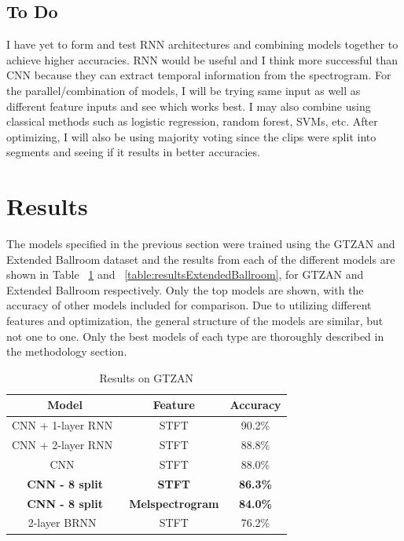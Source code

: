 \documentclass[10pt,twocolumn,letterpaper]{article}
\begin{document}
	\subsection{To Do}
	
	I have yet to form and test RNN architectures and combining models together to achieve higher accuracies. RNN would be useful and I think more successful than CNN because they can extract temporal information from the spectrogram. For the parallel/combination of models, I will be trying same input as well as different feature inputs and see which works best. I may also combine using classical methods such as logistic regression, random forest, SVMs, etc. After optimizing, I will also be using majority voting since the clips were split into segments and seeing if it results in better accuracies.
	
	\section{Results}
	
	The models specified in the previous section were trained using the GTZAN and Extended Ballroom dataset and the results from each of the different models are shown in Table ~\ref{table:resultsGTZAN} and ~\ref{table:resultsExtendedBallroom}, for GTZAN and Extended Ballroom respectively. Only the top models are shown, with the accuracy of other models included for comparison. Due to utilizing different features and optimization, the general structure of the models are similar, but not one to one. Only the best models of each type are thoroughly described in the methodology section.
	
	\begin{table}[!htbp] %
	\caption{Results on GTZAN}
	\centering
		\begin{tabular}[b]{ccc}
			\hline \hline
			Model & Feature & Accuracy 	\\ [0.5ex]
			\hline
			CNN + 1-layer RNN~\cite{yang2020parallel} & STFT & 90.2\%			\\
			CNN + 2-layer RNN~\cite{yang2020parallel} & STFT & 88.8\%			\\
			CNN~\cite{yang2020parallel} & STFT & 88.0\%							\\
			\textbf{CNN - 8 split} & \textbf{STFT} & \textbf{86.3\%} 					\\
			\textbf{CNN - 8 split} & \textbf{Melspectrogram} & \textbf{84.0\%} 			\\
			2-layer BRNN~\cite{schuster1997bidirectional} & STFT & 76.2\% 		\\
			[1ex]
		\end{tabular}
	\label{table:resultsGTZAN}
	\end{table}
\end{document}
